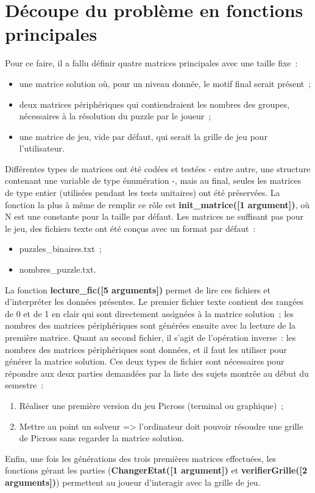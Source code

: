 \documentclass[a4paper,11pt]{article}
\begin{document}
\section[Fonctions principales]{Découpe du problème en fonctions principales}
\label{section:fonctions_principales}
Pour ce faire, il a fallu définir quatre matrices principales avec une taille fixe~:\medbreak
\begin{itemize}[label=$\square$]
	\item une matrice solution où, pour un niveau donnée, le motif final serait présent~;
	\item deux matrices périphériques qui contiendraient les nombres des groupes, nécessaires à la résolution du puzzle par le joueur~;
	\item une matrice de jeu, vide par défaut, qui serait la grille de jeu pour l'utilisateur.
\end{itemize}\bigbreak
Différentes types de matrices ont été codées et testées - entre autre, une structure contenant une variable de type énumération -, mais au final, seules les matrices de type entier (utilisées pendant les tests unitaires) ont été préservées. La fonction la plus à même de remplir ce rôle est \textbf{init\_matrice([1 argument])}, où N est une constante pour la taille par défaut.\bigbreak
Les matrices ne suffisant pas pour le jeu, des fichiers texte ont été  conçus avec un format par défaut~:\medbreak
\begin{itemize}[label=$\square$]
	\item puzzles\_binaires.txt~;
	\item nombres\_puzzle.txt.
\end{itemize}\bigbreak
La fonction \textbf{lecture\_fic([5 arguments])} permet de lire ces fichiers et d'interpréter les données présentes. Le premier fichier texte contient des rangées de 0 et de 1 en clair qui sont directement assignées à la matrice solution~; les nombres des matrices périphériques sont générées ensuite avec la lecture de la première matrice. Quant au second fichier, il s'agit de l'opération inverse~: les nombres des matrices périphériques sont données, et il faut les utiliser pour générer la matrice solution.\bigbreak
Ces deux types de fichier sont nécessaires pour répondre aux deux parties demandées par la liste des sujets montrée au début du semestre~:\medbreak
\begin{enumerate}
	\item Réaliser une première version du jeu \og Picross \fg{}  (terminal ou graphique)~;
	\item Mettre au point un solveur => l'ordinateur doit pouvoir résoudre une grille de Picross sans regarder la matrice solution.
\end{enumerate}\bigbreak
Enfin, une fois les générations des trois premières matrices effectuées, les fonctions gérant les parties (\textbf{ChangerEtat([1 argument])} et \textbf{verifierGrille([2 arguments])}) permettent au joueur d'interagir avec la grille de jeu.
\end{document}
